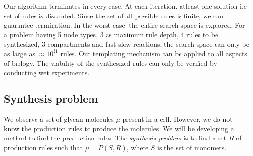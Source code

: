 Our algorithm terminates in every case. At each iteration, atleast one solution i.e set of rules is discarded. Since the set of all possible rules is finite, we can guarantee termination. In the worst case, the entire search space is explored. For a problem having 5 node types, 3 as maximum rule depth, 4 rules to be synthesized, 3 compartments and fast-slow reactions, the search space can only be as large as $\approx 10^{21}$ rules.
Our templating mechanism can be applied to all aspects of biology. The viability of the synthesized rules can only be verified by conducting wet experiments.
\subsection{Synthesis problem}
We observe a set of glycan molecules $\mu$ present in a cell.
%
However, we do not know the production rules to produce the molecules.
%
We will be developing a method to find the production rules.
%
The {\em synthesis problem} is to find a set $R$ of production rules
such that $\mu = P(S,R)$,
where $S$ is the set of monomers.




